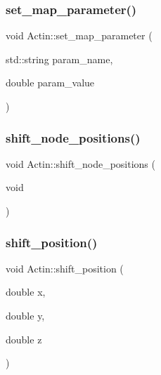 \subsubsection{\texorpdfstring{set\_map\_parameter()}{set\_map\_parameter()}}
{\footnotesize\ttfamily void Actin\+::set\+\_\+map\+\_\+parameter (\begin{DoxyParamCaption}\item[{std\+::string}]{param\+\_\+name,  }\item[{double}]{param\+\_\+value }\end{DoxyParamCaption})}

\mbox{\label{classActin_a87b0ca52480019247fa0075259619458}} 
\subsubsection{\texorpdfstring{shift\_node\_positions()}{shift\_node\_positions()}}
{\footnotesize\ttfamily void Actin\+::shift\+\_\+node\+\_\+positions (\begin{DoxyParamCaption}\item[{void}]{ }\end{DoxyParamCaption})\hspace{0.3cm}{\ttfamily [inline]}}

\mbox{\label{classActin_abc3996bfa64fb278823dc4e85c4ec9a4}} 
\subsubsection{\texorpdfstring{shift\_position()}{shift\_position()}}
{\footnotesize\ttfamily void Actin\+::shift\+\_\+position (\begin{DoxyParamCaption}\item[{double}]{x,  }\item[{double}]{y,  }\item[{double}]{z }\end{DoxyParamCaption})\hspace{0.3cm}{\ttfamily [inline]}}

\mbox{\label{classActin_ad98f0f42b66ec4d8b5fefb2ecec47a60}} 
